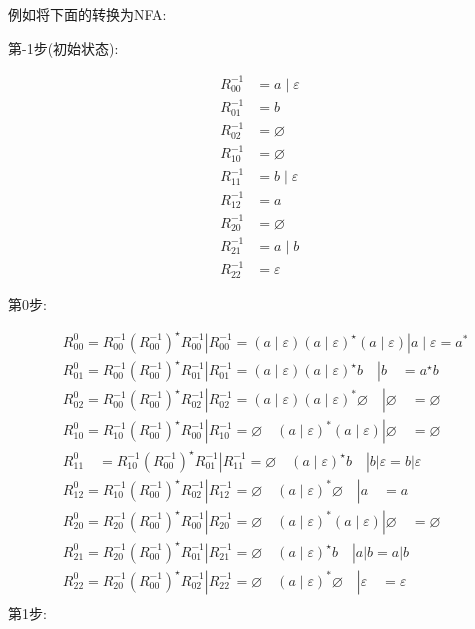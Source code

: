 \documentclass{ctexart}
\begin{document}
\begin{example}
例如将下面的转换为NFA: 


第-1步(初始状态):

$$
\begin{aligned}
R_{00}^{-1} & =a \mid \varepsilon \\
R_{01}^{-1} & =b \\
R_{02}^{-1} & =\varnothing \\
R_{10}^{-1} & =\varnothing \\
R_{11}^{-1} & =b \mid \varepsilon \\
R_{12}^{-1} & =a \\
R_{20}^{-1} & =\varnothing \\
R_{21}^{-1} & =a \mid b \\
R_{22}^{-1} & =\varepsilon
\end{aligned}
$$

第0步: 

$$
\begin{aligned}
& R_{00}^0=R_{00}^{-1}\left(R_{00}^{-1}\right)^{\star} R_{00}^{-1}\left|R_{00}^{-1}=(a \mid \varepsilon)(a \mid \varepsilon)^{\star}(a \mid \varepsilon)\right| a \mid \varepsilon=a^* \\
& R_{01}^0=R_{00}^{-1}\left(R_{00}^{-1}\right)^{\star} R_{01}^{-1}\left|R_{01}^{-1}=(a \mid \varepsilon)(a \mid \varepsilon)^{\star} b \quad\right| b \quad=a^{\star} b \\
& R_{02}^0=R_{00}^{-1}\left(R_{00}^{-1}\right)^{\star} R_{02}^{-1}\left|R_{02}^{-1}=(a \mid \varepsilon)(a \mid \varepsilon)^* \varnothing \quad\right| \varnothing \quad=\varnothing \\
& R_{10}^0=R_{10}^{-1}\left(R_{00}^{-1}\right)^{\star} R_{00}^{-1}\left|R_{10}^{-1}=\varnothing \quad(a \mid \varepsilon)^*(a \mid \varepsilon)\right| \varnothing \quad=\varnothing \\
& R_{11}^0 \quad=R_{10}^{-1}\left(R_{00}^{-1}\right)^{\star} R_{01}^{-1}\left|R_{11}^{-1}=\varnothing \quad(a \mid \varepsilon)^{\star} b \quad\right| b|\varepsilon=b| \varepsilon \\
& R_{12}^0=R_{10}^{-1}\left(R_{00}^{-1}\right)^{\star} R_{02}^{-1}\left|R_{12}^{-1}=\varnothing \quad(a \mid \varepsilon)^* \varnothing \quad\right| a \quad=a \\
& R_{20}^0=R_{20}^{-1}\left(R_{00}^{-1}\right)^{\star} R_{00}^{-1}\left|R_{20}^{-1}=\varnothing \quad(a \mid \varepsilon)^*(a \mid \varepsilon)\right| \varnothing \quad=\varnothing \\
& R_{21}^0=R_{20}^{-1}\left(R_{00}^{-1}\right)^{\star} R_{01}^{-1}\left|R_{21}^{-1}=\varnothing \quad(a \mid \varepsilon)^{\star} b \quad\right| a|b=a| b \\
& R_{22}^0=R_{20}^{-1}\left(R_{00}^{-1}\right)^{\star} R_{02}^{-1}\left|R_{22}^{-1}=\varnothing \quad(a \mid \varepsilon)^* \varnothing \quad\right| \varepsilon \quad=\varepsilon \\
&
\end{aligned}
$$
第1步:


\end{example}
\end{document}
